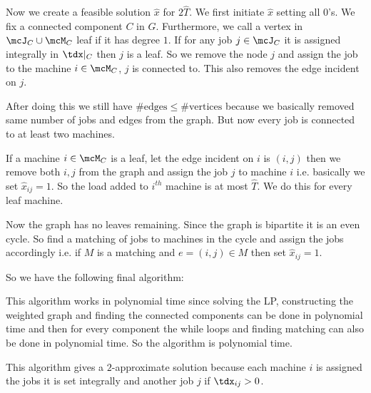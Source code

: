 Now we create a feasible solution $\hat{x}$ for $2\hat{T}$. We first initiate $\hat{x}$ setting all $0$'s. We fix a connected component $C$ in $G$. Furthermore, we call a vertex in $\mcJ_C\cup \mcM_C$ leaf if it has degree $1$. If for any job $j\in \mcJ_C$ it is assigned integrally in $\tdx|_C$ then $j$ is a leaf. So we remove the node $j$ and assign the job to the machine $i\in \mcM_C$, $j$ is connected to.  This also removes the edge incident on $j$. 

After doing this we still have $\#\text{edges}\leq \#\text{vertices}$ because we basically removed same number of jobs and edges from the graph. But now every job is connected to at least two machines. 

If a machine $i\in\mcM_C$ is a leaf, let the edge incident on $i$ is $(i,j)$ then we remove both $i,j$ from the graph and assign the job $j$ to machine $i$ i.e. basically we set $\hat{x}_{ij}=1$. So the load added to $i^{th}$ machine is at most $\hat{T}$. We do this for every leaf machine.

Now the graph has no leaves remaining. Since the graph is bipartite it is an even cycle. So find a matching of jobs to machines in the cycle and assign the jobs accordingly i.e. if $M$ is a matching and $e=(i,j)\in M$ then set $\hat{x}_{ij}=1$.\newpage

So we have the following final algorithm:

\begin{algorithm}
\DontPrintSemicolon
{}
\caption{Makespan $2$-Approximate Algorithm}
\end{algorithm}

This algorithm works in polynomial time since solving the LP,  constructing the weighted graph and finding the connected components can be done in polynomial time and then for every component the while loops and finding matching can also be done in polynomial time. So the algorithm is polynomial time.

This algorithm gives a $2$-approximate solution because each machine $i$ is assigned the jobs it is set integrally and another job $j$ if $\tdx_{ij}>0$. 